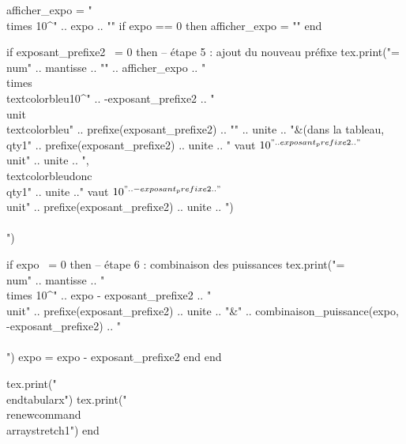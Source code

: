 \documentclass[../Cours.tex]{subfiles}
\begin{document}
\begin{luacode}
        afficher_expo = "\\times 10^{" .. expo .. "}"
        if expo == 0 then afficher_expo = "" end

        if exposant_prefixe2 ~= 0 then 
            -- étape 5 : ajout du nouveau préfixe
            tex.print("=\\num{" .. mantisse .. "}" .. afficher_expo .. " \\times \\textcolor{bleu}{10^{" .. -exposant_prefixe2 .. "}}~\\unit{\\textcolor{bleu}{" .. prefixe(exposant_prefixe2) .. "}" .. unite .. "}&(dans la tableau, \\qty{1}{" .. prefixe(exposant_prefixe2) .. unite .. "} vaut $10^{" .. exposant_prefixe2 .. "}$~\\unit{" .. unite .. "}, \\textcolor{bleu}{donc \\qty{1}{" .. unite .."} vaut $10^{" .. -exposant_prefixe2 .. "}$~\\unit{" .. prefixe(exposant_prefixe2) .. unite .. "}})\\\\")

            if expo ~= 0 then
                -- étape 6 : combinaison des puissances
                tex.print("=\\num{" .. mantisse .. "} \\times 10^{" .. expo - exposant_prefixe2 .. "}~\\unit{" .. prefixe(exposant_prefixe2) .. unite .. "}&" .. combinaison_puissance(expo, -exposant_prefixe2) .. "\\\\")
                expo = expo - exposant_prefixe2
            end
        end
        
        tex.print("\\end{tabularx}")
        tex.print("\\renewcommand{\\arraystretch}{1}")
    end
\end{luacode}




\end{document}
